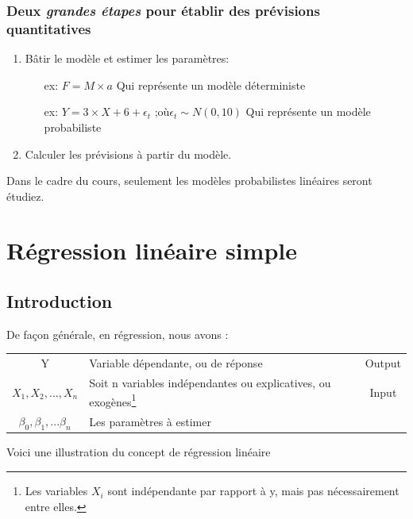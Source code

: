 \documentclass[11pt,french]{report}
\begin{document}
\subsection*{Deux \textit{grandes étapes} pour établir des prévisions quantitatives}
\begin{enumerate}
\item Bâtir le modèle et estimer les paramètres:
\begin{itemize}
\item[ex:] $F = M \times a$ Qui représente un modèle déterministe
\item[ex:] $Y =3 \times X + 6 + \epsilon_t \text{ ;où} \epsilon_t \sim N(0, 10)$ Qui représente un modèle probabiliste 
\end{itemize}
\item Calculer les prévisions à partir du modèle.
\end{enumerate}

\bigskip
Dans le cadre du cours, seulement les modèles probabilistes linéaires seront étudiez. 

\chapter{Régression linéaire simple}

\section{Introduction}

De façon générale, en régression, nous avons :

\begin{tabularx}{\linewidth}{c|X|c}
\hline
Y & Variable dépendante, ou de réponse & Output \\
$X_1, X_2, ..., X_n$ & Soit n variables indépendantes ou explicatives, ou exogènes\footnote{Les variables $X_i$ sont indépendante par rapport à y, mais pas nécessairement entre elles.} & Input \\
$\beta_0, \beta_1, ... \beta_n$ & Les paramètres à estimer & \\
\hline
\end{tabularx}

\bigskip
\bigskip
Voici une illustration du concept de régression linéaire
\end{document}
